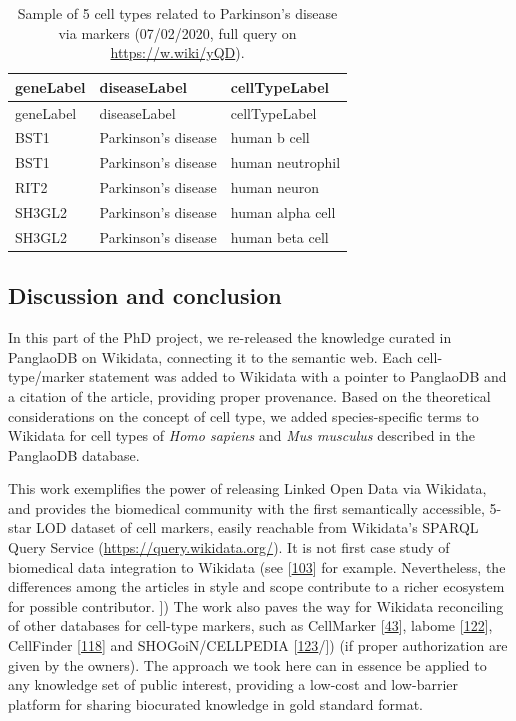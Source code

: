 \begin{longtable}[]{@{}lll@{}}
\caption{Sample of 5 cell types related to Parkinson's disease via markers (07/02/2020, full query on \url{https://w.wiki/yQD}).
\label{tbl:parkinson}}\tabularnewline
\toprule
geneLabel & diseaseLabel & cellTypeLabel \\
\midrule
\endfirsthead
\toprule
geneLabel & diseaseLabel & cellTypeLabel \\
\midrule
\endhead
BST1 & Parkinson's disease & human b cell \\
BST1 & Parkinson's disease & human neutrophil \\
RIT2 & Parkinson's disease & human neuron \\
SH3GL2 & Parkinson's disease & human alpha cell \\
SH3GL2 & Parkinson's disease & human beta cell \\
\bottomrule
\end{longtable}

\hypertarget{discussion-and-conclusion}{%
\subsection{Discussion and conclusion}\label{discussion-and-conclusion}}

In this part of the PhD project, we re-released the knowledge curated in PanglaoDB on Wikidata, connecting it to the semantic web.
Each cell-type/marker statement was added to Wikidata with a pointer to PanglaoDB and a citation of the article, providing proper provenance.
Based on the theoretical considerations on the concept of cell type, we added species-specific terms to Wikidata for cell types of \emph{Homo sapiens} and \emph{Mus musculus} described in the PanglaoDB database.

This work exemplifies the power of releasing Linked Open Data via Wikidata, and provides the biomedical community with the first semantically accessible, 5-star LOD dataset of cell markers, easily reachable from Wikidata's SPARQL Query Service (\url{https://query.wikidata.org/}).
It is not first case study of biomedical data integration to Wikidata (see {[}\protect\hyperlink{ref-mPoPwN77}{103}{]} for example.
Nevertheless, the differences among the articles in style and scope contribute to a richer ecosystem for possible contributor.
{]})
The work also paves the way for Wikidata reconciling of other databases for cell-type markers, such as CellMarker {[}\protect\hyperlink{ref-chGii6yw}{43}{]}, labome {[}\protect\hyperlink{ref-rhRRCtlA}{122}{]}, CellFinder {[}\protect\hyperlink{ref-4AEy2xhQ}{118}{]} and SHOGoiN/CELLPEDIA {[}\protect\hyperlink{ref-6uWWsiSq}{123}/{]}) (if proper authorization are given by the owners).
The approach we took here can in essence be applied to any knowledge set of public interest, providing a low-cost and low-barrier platform for sharing biocurated knowledge in gold standard format.

